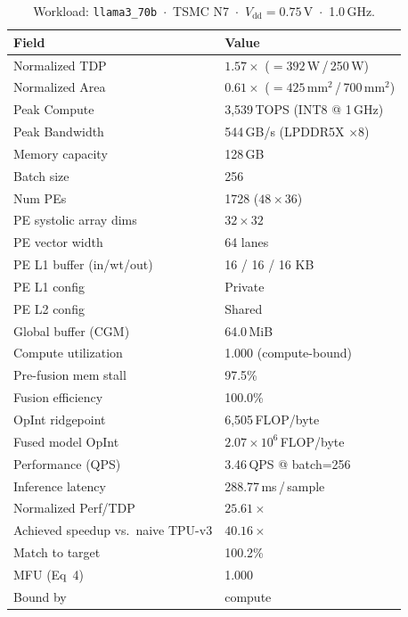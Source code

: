 \begin{table}[h]
\centering
\caption{Workload: \texttt{llama3\_70b}~$\cdot$~TSMC N7~$\cdot$~$V_\text{dd}=0.75$\,V~$\cdot$~1.0\,GHz.}
\label{tab:cheetah_v1_llama3_70b}
\small\setlength{\tabcolsep}{6pt}
\begin{tabular}{@{}ll@{}}
\toprule
\textbf{Field} & \textbf{Value} \\
\midrule
Normalized TDP          & $1.57\times$ ($= 392$\,W\,/\,250\,W) \\
Normalized Area         & $0.61\times$ ($= 425$\,mm$^2$\,/\,700\,mm$^2$) \\
Peak Compute            & 3{,}539\,TOPS (INT8 @ 1\,GHz) \\
Peak Bandwidth          & 544\,GB/s (LPDDR5X $\times$8) \\
Memory capacity         & 128\,GB \\
Batch size              & 256 \\
Num PEs                 & 1728 ($48 \times 36$) \\
PE systolic array dims  & $32 \times 32$ \\
PE vector width         & 64 lanes \\
PE L1 buffer (in/wt/out) & 16 / 16 / 16 KB \\
PE L1 config            & Private \\
PE L2 config            & Shared \\
Global buffer (CGM)     & 64.0\,MiB \\
\midrule
Compute utilization     & 1.000 (compute-bound) \\
Pre-fusion mem stall    & 97.5\% \\
Fusion efficiency       & 100.0\% \\
OpInt ridgepoint        & 6{,}505\,FLOP/byte \\
Fused model OpInt       & $2.07 \times 10^{6}$\,FLOP/byte \\
Performance (QPS)       & 3.46\,QPS @ batch=256 \\
Inference latency       & 288.77\,ms\,/\,sample \\
Normalized Perf/TDP     & $25.61\times$ \\
Achieved speedup vs.\ naive TPU-v3 & $40.16\times$ \\
Match to target         & 100.2\% \\
MFU (Eq~4)              & 1.000 \\
Bound by                & compute \\

\end{tabular}
\end{table}
